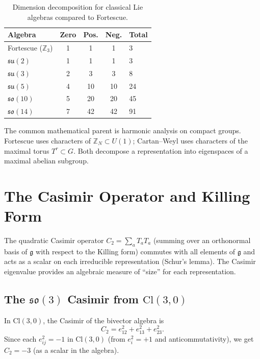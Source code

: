 \documentclass[11pt]{article}
\newcommand{\so}{\mathfrak{so}}
\newcommand{\su}{\mathfrak{su}}
\newcommand{\g}{\mathfrak{g}}
\newcommand{\Cl}{\mathrm{Cl}}
\newcommand{\ZZ}{\mathbb{Z}}
\begin{document}
\begin{table}[htbp]
\centering
\caption{Dimension decomposition for classical Lie algebras compared to
  Fortescue.}
\label{tab:decomp-comparison}
\begin{tabular}{@{}lcccl@{}}
\toprule
Algebra & Zero & Pos. & Neg. & Total \\
\midrule
Fortescue ($\ZZ_3$) & 1 & 1 & 1 & 3 \\
$\su(2)$ & 1 & 1 & 1 & 3 \\
$\su(3)$ & 2 & 3 & 3 & 8 \\
$\su(5)$ & 4 & 10 & 10 & 24 \\
$\so(10)$ & 5 & 20 & 20 & 45 \\
$\so(14)$ & 7 & 42 & 42 & 91 \\
\bottomrule
\end{tabular}
\end{table}

The common mathematical parent is harmonic analysis on compact groups.
Fortescue uses characters of $\ZZ_N \subset U(1)$; Cartan--Weyl uses
characters of the maximal torus $T^r \subset G$. Both decompose a
representation into eigenspaces of a maximal abelian subgroup.

\section{The Casimir Operator and Killing Form}
\label{sec:casimir}

The quadratic Casimir operator $C_2 = \sum_a T_a T_a$ (summing over an
orthonormal basis of $\g$ with respect to the Killing form) commutes
with all elements of $\g$ and acts as a scalar on each irreducible
representation (Schur's lemma). The Casimir eigenvalue provides an
algebraic measure of ``size'' for each representation.

\subsection{The $\so(3)$ Casimir from $\Cl(3,0)$}

In $\Cl(3,0)$, the Casimir of the bivector algebra is
\begin{equation}\label{eq:casimir-cl30}
  C_2 = e_{12}^2 + e_{13}^2 + e_{23}^2.
\end{equation}
Since each $e_{ij}^2 = -1$ in $\Cl(3,0)$ (from $e_i^2 = +1$ and
anticommutativity), we get $C_2 = -3$ (as a scalar in the algebra).
\end{document}
